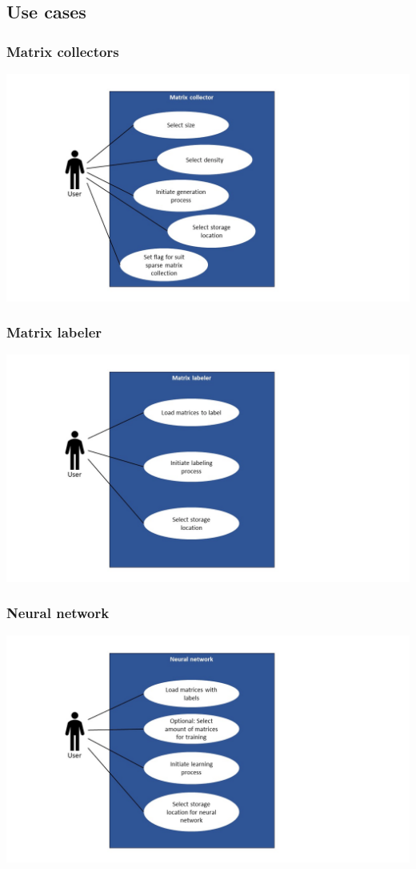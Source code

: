 \documentclass[parskip=full]{scrartcl}
\begin{document}
\subsection{Use cases}
\subsubsection{Matrix \glspl{collector}}
\includegraphics[width=1.3\textwidth]{useCase_collector}
\subsubsection{Matrix labeler}
\includegraphics[width=1.3\textwidth]{useCase_Labeler}
\subsubsection{Neural network}
\includegraphics[width=1.3\textwidth]{useCase_NeuralNetwork}
\end{document}
